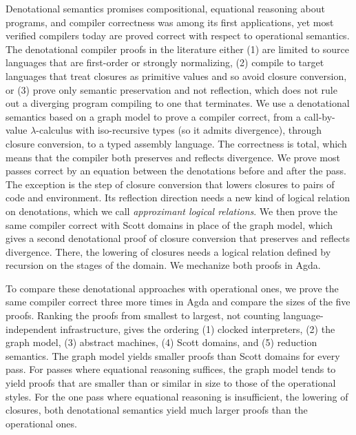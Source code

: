 
Denotational semantics promises compositional, equational reasoning
about programs, and compiler correctness was among its first
applications, yet most verified compilers today are proved correct
with respect to operational semantics. The denotational compiler
proofs in the literature either (1) are limited to source languages
that are first-order or strongly normalizing, (2) compile to target
languages that treat closures as primitive values and so avoid closure
conversion, or (3) prove only semantic preservation and not
reflection, which does not rule out a diverging program compiling to
one that terminates. We use a denotational semantics based on a graph
model to prove a compiler correct, from a call-by-value
$\lambda$-calculus with iso-recursive types (so it admits divergence),
through closure conversion, to a typed assembly language. The
correctness is total, which means that the compiler both preserves and
reflects divergence. We prove most passes correct by an equation
between the denotations before and after the pass. The exception is
the step of closure conversion that lowers closures to pairs of code
and environment. Its reflection direction needs a new kind of logical
relation on denotations, which we call \emph{approximant logical
relations}. We then prove the same compiler correct with Scott domains
in place of the graph model, which gives a second denotational proof
of closure conversion that preserves and reflects divergence. There,
the lowering of closures needs a logical relation defined by recursion
on the stages of the domain. We mechanize both proofs in Agda.

To compare these denotational approaches with operational ones, we
prove the same compiler correct three more times in Agda and compare
the sizes of the five proofs. Ranking the proofs from smallest to
largest, not counting language-independent infrastructure, gives the
ordering (1) clocked interpreters, (2) the graph model, (3) abstract
machines, (4) Scott domains, and (5) reduction semantics. The graph
model yields smaller proofs than Scott domains for every pass. For
passes where equational reasoning suffices, the graph model tends to
yield proofs that are smaller than or similar in size to those of the
operational styles. For the one pass where equational reasoning is
insufficient, the lowering of closures, both denotational semantics
yield much larger proofs than the operational ones.
